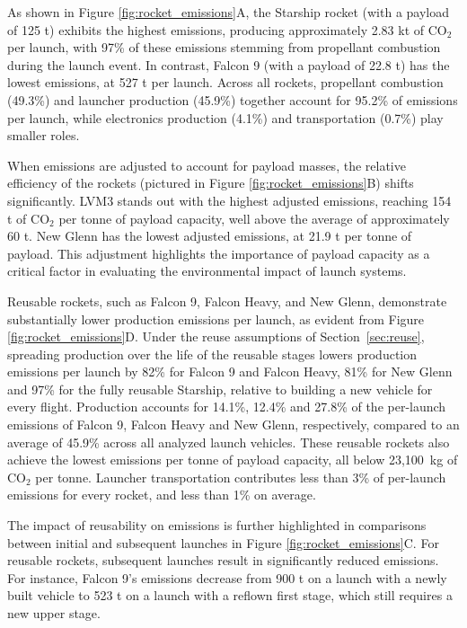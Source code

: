 \documentclass[pdflatex,sn-mathphys-num]{sn-jnl}
\theoremstyle{thmstyleone}%
\theoremstyle{thmstyletwo}%
\theoremstyle{thmstylethree}%
\begin{document}
As shown in Figure \ref{fig:rocket_emissions}A, the Starship rocket (with a payload of 125 t) exhibits the highest emissions, producing approximately 2.83 kt of CO$_2$ per launch, with 97\% of these emissions stemming from propellant combustion during the launch event. In contrast, Falcon 9 (with a payload of 22.8 t) has the lowest emissions, at 527 t per launch. Across all rockets, propellant combustion (49.3\%) and launcher production (45.9\%) together account for 95.2\% of emissions per launch, while electronics production (4.1\%) and transportation (0.7\%) play smaller roles.

When emissions are adjusted to account for payload masses, the relative efficiency of the rockets (pictured in Figure \ref{fig:rocket_emissions}B) shifts significantly. LVM3 stands out with the highest adjusted emissions, reaching 154 t of CO$_2$ per tonne of payload capacity, well above the average of approximately 60 t. New Glenn has the lowest adjusted emissions, at 21.9 t per tonne of payload. This adjustment highlights the importance of payload capacity as a critical factor in evaluating the environmental impact of launch systems.

Reusable rockets, such as Falcon 9, Falcon Heavy, and New Glenn, demonstrate substantially lower production emissions per launch, as evident from Figure \ref{fig:rocket_emissions}D. Under the reuse assumptions of Section~\ref{sec:reuse}, spreading production over the life of the reusable stages lowers production emissions per launch by 82\% for Falcon 9 and Falcon Heavy, 81\% for New Glenn and 97\% for the fully reusable Starship, relative to building a new vehicle for every flight. Production accounts for 14.1\%, 12.4\% and 27.8\% of the per-launch emissions of Falcon 9, Falcon Heavy and New Glenn, respectively, compared to an average of 45.9\% across all analyzed launch vehicles. These reusable rockets also achieve the lowest emissions per tonne of payload capacity, all below 23,100~kg of CO$_2$ per tonne. Launcher transportation contributes less than 3\% of per-launch emissions for every rocket, and less than 1\% on average.

The impact of reusability on emissions is further highlighted in comparisons between initial and subsequent launches in Figure \ref{fig:rocket_emissions}C. For reusable rockets, subsequent launches result in significantly reduced emissions. For instance, Falcon 9's emissions decrease from 900 t on a launch with a newly built vehicle to 523 t on a launch with a reflown first stage, which still requires a new upper stage.
\end{document}

